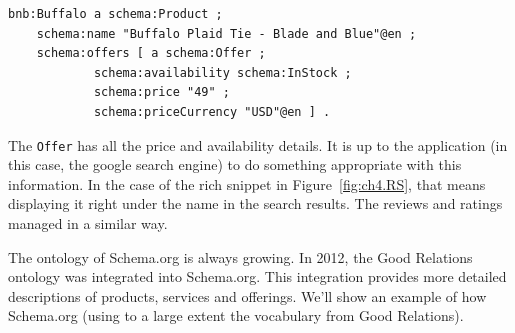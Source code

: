 \begin{lstlisting}
bnb:Buffalo a schema:Product ;
    schema:name "Buffalo Plaid Tie - Blade and Blue"@en ;
    schema:offers [ a schema:Offer ;
            schema:availability schema:InStock ;
            schema:price "49" ;
            schema:priceCurrency "USD"@en ] .
\end{lstlisting}


The \texttt{Offer} has all the price and availability details.  It is up to the 
application (in this case, the google search engine) to do something appropriate
with this information.  In the case of the rich snippet in Figure~\ref{fig:ch4.RS}, that
means displaying it right under the name in the search results.  The reviews and ratings 
managed in a similar way. 

The ontology of Schema.org is always growing.  In 2012, the Good Relations ontology
was integrated into Schema.org.  This integration provides more detailed descriptions of 
products, services and offerings.  We'll show an example of how Schema.org 
(using to a large extent the vocabulary from Good Relations).

